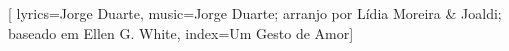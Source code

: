 %

\setcounter{songnum}{136}

[
        lyrics={Jorge Duarte}, 
        music={Jorge Duarte; arranjo por Lídia Moreira \& Joaldi; baseado em Ellen G. White},
        index={Um Gesto de Amor}]

